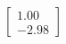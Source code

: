 \documentclass[preview]{standalone}
\begin{document}
\begin{align*}
\begin{bmatrix} 1.00 \\ -2.98 \end{bmatrix}
\end{align*}
\end{document}

